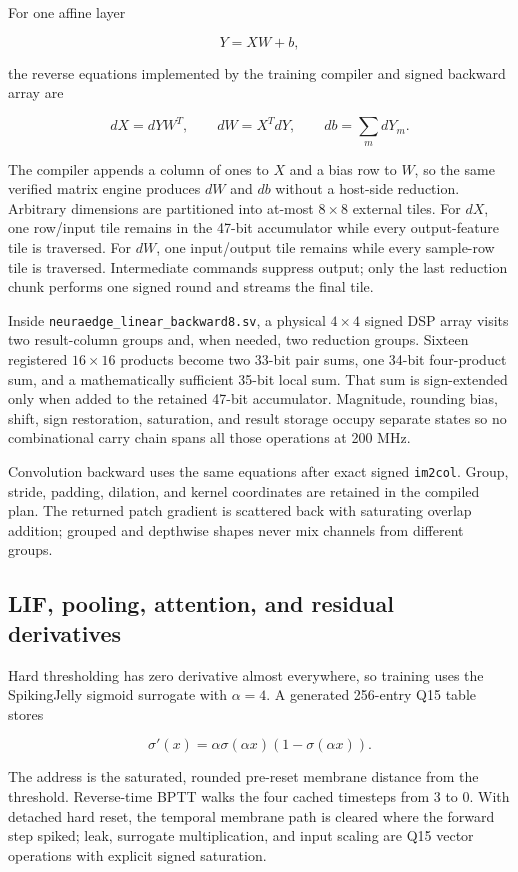 \documentclass[10pt]{article}
\begin{document}
For one affine layer

\[
  Y=XW+b,
\]

the reverse equations implemented by the training compiler and signed backward
array are

\[
  dX=dY W^{T},\qquad dW=X^{T}dY,\qquad db=\sum_m dY_m.
\]

The compiler appends a column of ones to $X$ and a bias row to $W$, so the same
verified matrix engine produces $dW$ and $db$ without a host-side reduction.
Arbitrary dimensions are partitioned into at-most $8\times8$ external tiles.
For $dX$, one row/input tile remains in the 47-bit accumulator while every
output-feature tile is traversed. For $dW$, one input/output tile remains while
every sample-row tile is traversed. Intermediate commands suppress output; only
the last reduction chunk performs one signed round and streams the final tile.

Inside \texttt{neuraedge\_linear\_backward8.sv}, a physical $4\times4$ signed
DSP array visits two result-column groups and, when needed, two reduction
groups. Sixteen registered $16\times16$ products become two 33-bit pair sums,
one 34-bit four-product sum, and a mathematically sufficient 35-bit local sum.
That sum is sign-extended only when added to the retained 47-bit accumulator.
Magnitude, rounding bias, shift, sign restoration, saturation, and result
storage occupy separate states so no combinational carry chain spans all those
operations at 200 MHz.

Convolution backward uses the same equations after exact signed
\texttt{im2col}. Group, stride, padding, dilation, and kernel coordinates are
retained in the compiled plan. The returned patch gradient is scattered back
with saturating overlap addition; grouped and depthwise shapes never mix
channels from different groups.

\subsection{LIF, pooling, attention, and residual derivatives}

Hard thresholding has zero derivative almost everywhere, so training uses the
SpikingJelly sigmoid surrogate with $\alpha=4$. A generated 256-entry Q15 table
stores

\[
  \sigma'(x)=\alpha\sigma(\alpha x)(1-\sigma(\alpha x)).
\]

The address is the saturated, rounded pre-reset membrane distance from the
threshold. Reverse-time BPTT walks the four cached timesteps from 3 to 0. With
detached hard reset, the temporal membrane path is cleared where the forward
step spiked; leak, surrogate multiplication, and input scaling are Q15 vector
operations with explicit signed saturation.
\end{document}
